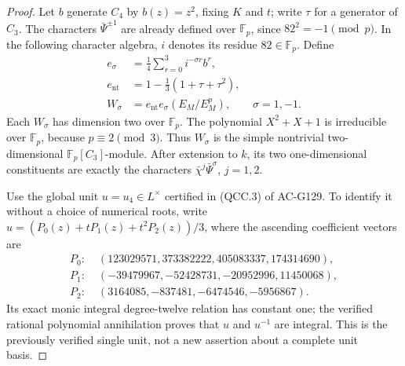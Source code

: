 \begin{proof}
Let \(b\) generate \(C_4\) by \(b(z)=z^2\), fixing \(K\) and \(t\);
write \(\tau\) for a generator of \(C_3\).  The characters
\(\bar\Psi^{\pm1}\) are already defined over \(\mathbb F_p\), since
\(82^2=-1\pmod p\).  In the following character algebra, \(i\)
denotes its residue \(82\in\mathbb F_p\).  Define
\[
 \begin{split}
 e_\sigma&=\frac14\sum_{r=0}^3 i^{-\sigma r}b^r,\\
 e_{\mathrm{nt}}&=1-\frac13(1+\tau+\tau^2),\\
 W_\sigma&=e_{\mathrm{nt}}e_\sigma(E_M/E_M^p),
                  \qquad \sigma=1,-1 .
 \end{split}
 \tag{QSV.11}
\]
Each \(W_\sigma\) has dimension two over \(\mathbb F_p\).
The polynomial \(X^2+X+1\) is irreducible over \(\mathbb F_p\),
because \(p\equiv2\pmod3\).  Thus \(W_\sigma\) is the simple
nontrivial two-dimensional \(\mathbb F_p[C_3]\)-module.
After extension to \(k\), its two one-dimensional constituents
are exactly the characters
\(\bar\chi^j\bar\Psi^\sigma\), \(j=1,2\).

Use the global unit \(u=u_4\in L^\times\) certified in
(QCC.3) of AC-G129.  To identify it without a choice of numerical
roots, write \(u=(P_0(z)+tP_1(z)+t^2P_2(z))/3\), where the
ascending coefficient vectors are
\[
 \begin{split}
 P_0:\;&(123029571,373382222,405083337,174314690),\\
 P_1:\;&(-39479967,-52428731,-20952996,11450068),\\
 P_2:\;&(3164085,-837481,-6474546,-5956867).
 \end{split}
 \tag{QSV.12}
\]
Its exact monic integral degree-twelve relation has constant one;
the verified rational polynomial annihilation proves that \(u\)
and \(u^{-1}\) are integral.  This is the previously verified
single unit, not a new assertion about a complete unit basis.


\end{proof}
